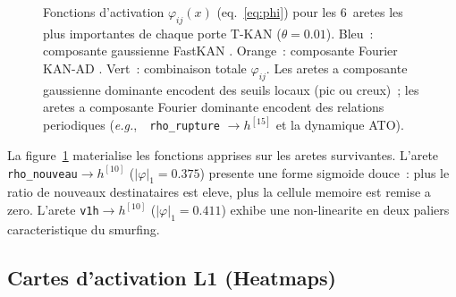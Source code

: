 \documentclass[11pt,a4paper,twocolumn]{article}
\newcommand{\eg}{\textit{e.g.},~}
\newcommand{\phiij}{\varphi_{ij}}
\begin{document}
\begin{figure}[p]
  \caption{Fonctions d'activation $\phiij(x)$ (eq.~\ref{eq:phi}) pour les
           6~aretes les plus importantes de chaque porte T-KAN ($\theta=0.01$).
           \textcolor{mkanblue}{Bleu}~: composante gaussienne FastKAN
           \cite{li2024fastkan}.
           \textcolor{lstmorange}{Orange}~: composante Fourier KAN-AD
           \cite{bozorgasl2024wav}.
           Vert~: combinaison totale $\phiij$.
           Les aretes a composante gaussienne dominante encodent des seuils
           locaux (pic ou creux)~; les aretes a composante Fourier dominante
           encodent des relations periodiques (\eg~\texttt{rho\_rupture}
           $\to h^{[15]}$ et la dynamique ATO).}
  \label{fig:edgefuncs}
\end{figure}

La figure~\ref{fig:edgefuncs} materialise les fonctions apprises
sur les aretes survivantes. L'arete \texttt{rho\_nouveau}$\to h^{[10]}$
($|\varphi|_1=0.375$) presente une forme sigmoide douce~: plus
le ratio de nouveaux destinataires est eleve, plus la cellule
memoire est remise a zero. L'arete \texttt{v1h}$\to h^{[10]}$
($|\varphi|_1=0.411$) exhibe une non-linearite en deux paliers
caracteristique du smurfing.

\subsection{Cartes d'activation L1 (Heatmaps)}
\end{document}
